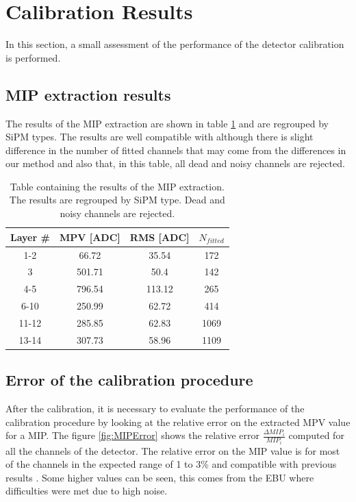 \section{Calibration Results}

In this section, a small assessment of the performance of the detector calibration is performed.

\subsection{MIP extraction results}

The results of the MIP extraction are shown in table \ref{table:MIPAHCAL} and are regrouped by SiPM types. The results are well compatible with \cite{SarahMaster} although there is slight difference in the number of fitted channels that may come from the differences in our method and also that, in this table, all dead and noisy channels are rejected.

\begin{table}[htb!]
	\centering
	\caption{Table containing the results of the MIP extraction. The results are regrouped by SiPM type. Dead and noisy channels are rejected.}
	\label{table:MIPAHCAL}
	\begin{tabular}{@{} cccc @{}}
		\hline
		Layer \# & MPV [ADC] & RMS [ADC] & $N_{fitted}$\\
		\hline
		\hline
		1-2 & 66.72 & 35.54 & 172\\
		3 & 501.71 & 50.4 & 142\\
		4-5 & 796.54 & 113.12 & 265\\
		6-10 & 250.99 & 62.72 & 414\\
		11-12 & 285.85 & 62.83 & 1069\\
		13-14 & 307.73 & 58.96 & 1109\\
		\hline
	\end{tabular}
\end{table}

\subsection{Error of the calibration procedure}

After the calibration, it is necessary to evaluate the performance of the calibration procedure by looking at the relative error on the extracted MPV value for a MIP. The figure \ref{fig:MIPError} shows the relative error $\frac{\Delta MIP_i}{MIP_i}$ computed for all the channels of the detector. The relative error on the MIP value is for most of the channels in the expected range of 1 to 3\% and compatible with previous results \cite{SarahMaster}. Some higher values can be seen, this comes from the EBU where difficulties were met due to high noise.

